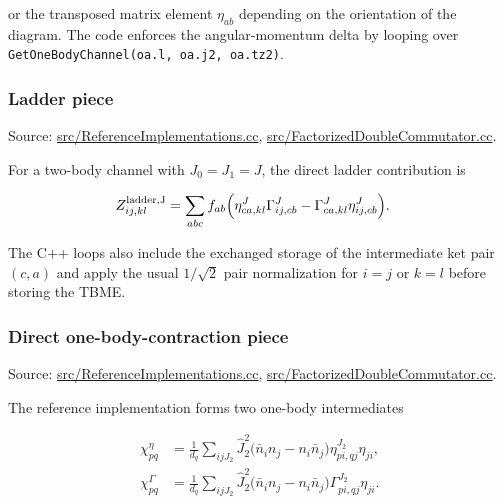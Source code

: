 \documentclass[
]{article}
\begin{document}
or the transposed matrix element \(\eta_{ab}\) depending on the
orientation of the diagram. The code enforces the angular-momentum delta
by looping over \texttt{GetOneBodyChannel(oa.l,\ oa.j2,\ oa.tz2)}.

\subsubsection{Ladder piece}\label{ladder-piece}

Source:
\href{../src/ReferenceImplementations.cc\#L13357-L13424}{src/ReferenceImplementations.cc},
\href{../src/FactorizedDoubleCommutator.cc\#L3058-L3142}{src/FactorizedDoubleCommutator.cc}.

For a two-body channel with \(J_0=J_1=J\), the direct ladder
contribution is

\begin{equation}
\begin{aligned}
Z^{\rm ladder,J}_{ij,kl}
&=\sum_{abc} f_{ab}
\Big(
\eta^J_{ca,kl}\Gamma^J_{ij,cb}
-\Gamma^J_{ca,kl}\eta^J_{ij,cb}
\Big) .
\end{aligned}
\end{equation}

The C++ loops also include the exchanged storage of the intermediate ket
pair \((c,a)\) and apply the usual \(1/\sqrt2\) pair normalization for
\(i=j\) or \(k=l\) before storing the TBME.

\subsubsection{Direct one-body-contraction
piece}\label{direct-one-body-contraction-piece}

Source:
\href{../src/ReferenceImplementations.cc\#L13553-L13775}{src/ReferenceImplementations.cc},
\href{../src/FactorizedDoubleCommutator.cc\#L3150-L3278}{src/FactorizedDoubleCommutator.cc}.

The reference implementation forms two one-body intermediates

\begin{equation}
\begin{aligned}
\chi^\eta_{pq}
&=\frac{1}{d_q}\sum_{ijJ_2}\hat J_2^2
\big(\bar n_i n_j-n_i\bar n_j\big)
\eta^{J_2}_{pi,qj}\eta_{ji},\\
\chi^\Gamma_{pq}
&=\frac{1}{d_q}\sum_{ijJ_2}\hat J_2^2
\big(\bar n_i n_j-n_i\bar n_j\big)
\Gamma^{J_2}_{pi,qj}\eta_{ji}.
\end{aligned}
\end{equation}
\end{document}

